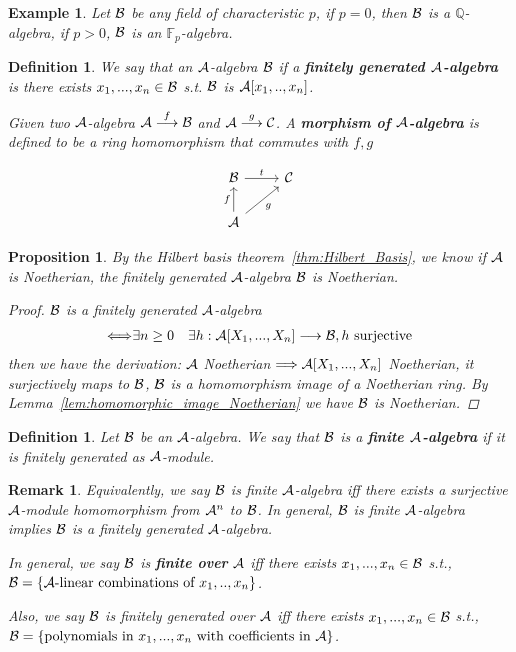 \documentclass[11pt]{article}
\newtheorem{prop}[thm]{Proposition}
\newtheorem{dfn}[thm]{Definition}
\newtheorem{rmk}[thm]{Remark}
\newtheorem{ex}[thm]{Example}
\newcommand{\bbf}{\mathbb F}
\newcommand{\ratl}{\mathbb Q}
\newcommand{\cala}{{\cal A}}
\newcommand{\calb}{{\cal B}}
\newcommand{\calc}{{\cal C}}
\newcommand{\Lrta}{\Longrightarrow}
\newcommand{\lrta}{\longrightarrow}
\newcommand{\Llrta}{\Longleftrightarrow}
\begin{document}
\begin{ex}
Let $\calb$ be any field of characteristic $p$, if $p=0$, then $\calb$ is a $\ratl$-algebra, if $p>0$, $\calb$ is an $\bbf_p$-algebra.
\end{ex}

\begin{dfn}
We say that an $\cala$-algebra $\calb$ if a \textbf{finitely generated $\cala$-algebra} is there exists $x_1,...,x_n\in \calb$ s.t. $\calb$ is $\cala[x_1,..,x_n]$. 

Given two $\cala$-algebra $\cala\overset{f}{\lrta}\calb$ and $\cala\overset{g}{\lrta}\calc$. A \textbf{morphism of $\cala$-algebra} is defined to be a ring homomorphism that commutes with $f,g$

\[
\begin{tikzcd}
\calb\ar[r, "t"]&\calc\\
\cala \ar[u, "f"]\ar[ur,swap, "g"] 
\end{tikzcd}
\] 
\end{dfn}

\begin{prop}
By the Hilbert basis theorem~\ref{thm:Hilbert_Basis}, we know if $\cala$ is Noetherian, the finitely generated $\cala$-algebra $\calb$ is Noetherian.
\begin{proof}
$\calb$ is a finitely generated $\cala$-algebra\\
$$
\begin{aligned}
\Llrta &\exists n\geq 0
& \exists h:\cala[X_1,...,X_n]\lrta \calb, h\text{ surjective}
\end{aligned}
$$
then we have the derivation: $\cala$ Noetherian $\Lrta \cala[X_1,...,X_n]$ Noetherian, it surjectively maps to $\calb$, $\calb$ is a homomorphism image of a Noetherian ring. By Lemma~\ref{lem:homomorphic_image_Noetherian} we have $\calb$ is Noetherian.
\end{proof}
\end{prop}

\begin{dfn} Let $\calb$ be an $\cala$-algebra.
We say that $\calb$ is a\textbf{ finite $\cala$-algebra} if it is finitely generated as $\cala$-module. 
 \end{dfn}

\begin{rmk}
Equivalently, we say $\calb$ is finite $\cala$-algebra iff there exists a surjective $\cala$-module homomorphism from $\cala^n$ to $\calb$. In general, $\calb$ is finite $\cala$-algebra implies $\calb$ is a finitely generated $\cala$-algebra.

In general, we say $\calb$ is \textbf{finite over} $\cala$ iff there exists $x_1,...,x_n\in\calb$ s.t., $\calb=\{\cala\text{-linear combinations of $x_1,..,x_n$}\}$. 

Also, we say $\calb$ is finitely generated over $\cala$ iff there exists $x_1,...,x_n\in\calb$ s.t., $\calb=\{\text{polynomials in $x_1,...,x_n$ with coefficients in $\cala$}\}$.
\end{rmk}
\end{document}
